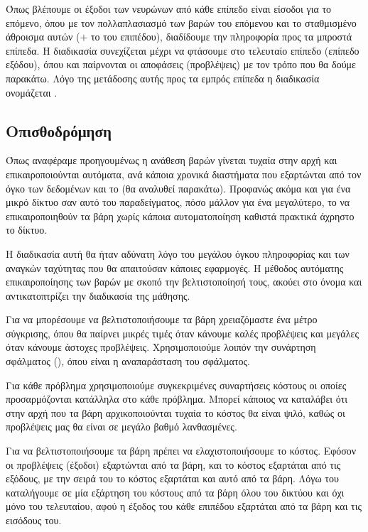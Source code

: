 Όπως βλέπουμε οι έξοδοι των νευρώνων από κάθε επίπεδο είναι είσοδοι για το επόμενο,
όπου με τον πολλαπλασιασμό των βαρών του επόμενου και το σταθμισμένο άθροισμα αυτών
($+$ το  του επιπέδου), διαδίδουμε την πληροφορία προς τα μπροστά επίπεδα. Η
διαδικασία συνεχίζεται μέχρι να φτάσουμε στο τελευταίο επίπεδο (επίπεδο εξόδου), όπου
και παίρνονται οι αποφάσεις (προβλέψεις) με τον τρόπο που θα δούμε παρακάτω. Λόγο της
μετάδοσης αυτής προς τα εμπρός επίπεδα η διαδικασία ονομάζεται .
\subsection{Οπισθοδρόμηση}
Όπως αναφέραμε προηγουμένως η ανάθεση βαρών γίνεται τυχαία στην αρχή και
επικαιροποιούνται αυτόματα, ανά κάποια χρονικά διαστήματα που εξαρτώνται από τον όγκο
των δεδομένων και το  (θα αναλυθεί παρακάτω). Προφανώς ακόμα και για ένα
μικρό δίκτυο σαν αυτό του παραδείγματος, πόσο μάλλον για ένα μεγαλύτερο, το να
επικαιροποιηθούν τα βάρη χωρίς κάποια αυτοματοποίηση καθιστά πρακτικά άχρηστο το δίκτυο.

Η διαδικασία αυτή θα ήταν αδύνατη λόγο του μεγάλου όγκου πληροφορίας και των αναγκών
ταχύτητας που θα απαιτούσαν κάποιες εφαρμογές. Η μέθοδος αυτόματης επικαιροποίησης
των βαρών με σκοπό την βελτιστοποίησή τους, ακούει στο όνομα  και
αντικατοπτρίζει την διαδικασία της μάθησης.

Για να μπορέσουμε να βελτιστοποιήσουμε τα βάρη χρειαζόμαστε ένα μέτρο σύγκρισης, όπου
θα παίρνει μικρές τιμές όταν κάνουμε καλές προβλέψεις και μεγάλες όταν κάνουμε άστοχες
προβλέψεις. Χρησιμοποιούμε λοιπόν την συνάρτηση σφάλματος (), όπου 
είναι η αναπαράσταση του σφάλματος.

Για κάθε πρόβλημα χρησιμοποιούμε συγκεκριμένες
συναρτήσεις κόστους οι οποίες προσαρμόζονται κατάλληλα στο κάθε πρόβλημα. Μπορεί
κάποιος να καταλάβει ότι στην αρχή που τα βάρη αρχικοποιούνται τυχαία το κόστος θα είναι
ψιλό, καθώς οι προβλέψεις μας θα είναι σε μεγάλο βαθμό λανθασμένες.

Για να
βελτιστοποιήσουμε τα βάρη πρέπει να ελαχιστοποιήσουμε το κόστος. Εφόσον οι προβλέψεις
(έξοδοι) εξαρτώνται από τα βάρη, και το κόστος εξαρτάται από τις εξόδους, με την σειρά του
το κόστος εξαρτάται και αυτό από τα βάρη. Λόγω του  καταλήγουμε σε
μία εξάρτηση του κόστους από τα βάρη όλου του δικτύου και όχι μόνο του τελευταίου, αφού
η έξοδος του κάθε επιπέδου εξαρτάται από τα βάρη και τις εισόδους του.

